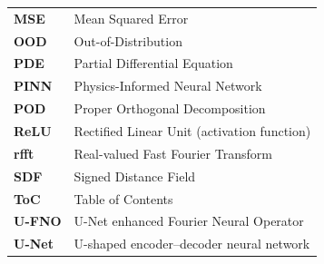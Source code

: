 \begin{tabular}{@{}p{3cm}p{11cm}@{}}
    \textbf{MSE}    & Mean Squared Error \\
    \textbf{OOD}    & Out-of-Distribution \\
    \textbf{PDE}    & Partial Differential Equation \\
    \textbf{PINN}   & Physics-Informed Neural Network \\
    \textbf{POD}    & Proper Orthogonal Decomposition \\
    \textbf{ReLU}   & Rectified Linear Unit (activation function) \\
    \textbf{rfft}   & Real-valued Fast Fourier Transform \\
    \textbf{SDF}    & Signed Distance Field \\
    \textbf{ToC}    & Table of Contents \\
    \textbf{U-FNO}  & U-Net enhanced Fourier Neural Operator \\
    \textbf{U-Net}  & U-shaped encoder--decoder neural network \\
\end{tabular}
